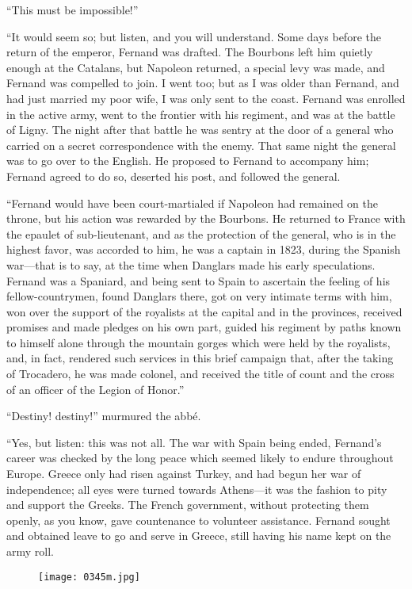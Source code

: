 “This must be impossible!”

“It would seem so; but listen, and you will understand. Some days
before the return of the emperor, Fernand was drafted. The Bourbons
left him quietly enough at the Catalans, but Napoleon returned, a
special levy was made, and Fernand was compelled to join. I went too;
but as I was older than Fernand, and had just married my poor wife, I
was only sent to the coast. Fernand was enrolled in the active army,
went to the frontier with his regiment, and was at the battle of Ligny.
The night after that battle he was sentry at the door of a general who
carried on a secret correspondence with the enemy. That same night the
general was to go over to the English. He proposed to Fernand to
accompany him; Fernand agreed to do so, deserted his post, and followed
the general.

“Fernand would have been court-martialed if Napoleon had remained on
the throne, but his action was rewarded by the Bourbons. He returned to
France with the epaulet of sub-lieutenant, and as the protection of the
general, who is in the highest favor, was accorded to him, he was a
captain in 1823, during the Spanish war—that is to say, at the time
when Danglars made his early speculations. Fernand was a Spaniard, and
being sent to Spain to ascertain the feeling of his fellow-countrymen,
found Danglars there, got on very intimate terms with him, won over the
support of the royalists at the capital and in the provinces, received
promises and made pledges on his own part, guided his regiment by paths
known to himself alone through the mountain gorges which were held by
the royalists, and, in fact, rendered such services in this brief
campaign that, after the taking of Trocadero, he was made colonel, and
received the title of count and the cross of an officer of the Legion
of Honor.”

“Destiny! destiny!” murmured the abbé.

“Yes, but listen: this was not all. The war with Spain being ended,
Fernand’s career was checked by the long peace which seemed likely to
endure throughout Europe. Greece only had risen against Turkey, and had
begun her war of independence; all eyes were turned towards Athens—it
was the fashion to pity and support the Greeks. The French government,
without protecting them openly, as you know, gave countenance to
volunteer assistance. Fernand sought and obtained leave to go and serve
in Greece, still having his name kept on the army roll.

\begin{figure}[ht]
\texttt{[image: 0345m.jpg]}
\end{figure}

